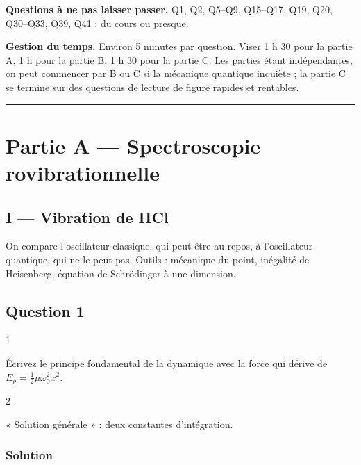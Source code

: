 \documentclass[11pt,a4paper]{article}
\begin{document}
\textbf{Questions à ne pas laisser passer.} Q1, Q2, Q5--Q9, Q15--Q17, Q19, Q20, Q30--Q33, Q39, Q41 : du cours ou presque.

\textbf{Gestion du temps.} Environ 5 minutes par question. Viser 1 h 30 pour la partie A, 1 h pour la partie B, 1 h 30 pour la partie C. Les parties étant indépendantes, on peut commencer par B ou C si la mécanique quantique inquiète ; la partie C se termine sur des questions de lecture de figure rapides et rentables.

\begin{center}\rule{0.5\linewidth}{0.5pt}\end{center}

\hypertarget{partie-a-spectroscopie-rovibrationnelle}{%
\section{Partie A --- Spectroscopie rovibrationnelle}\label{partie-a-spectroscopie-rovibrationnelle}}

\hypertarget{i-vibration-de-hcl}{%
\subsection{I --- Vibration de HCl}\label{i-vibration-de-hcl}}

On compare l'oscillateur classique, qui peut être au repos, à l'oscillateur quantique, qui ne le peut pas. Outils : mécanique du point, inégalité de Heisenberg, équation de Schrödinger à une dimension.

\hypertarget{question-1}{%
\subsection{Question 1}\label{question-1}}

\begin{indication}{1}

Écrivez le principe fondamental de la dynamique avec la force qui dérive de \(E_p=\frac12\mu\omega_0^2x^2\).

\end{indication}

\begin{indication}{2}

« Solution générale » : deux constantes d'intégration.

\end{indication}

\hypertarget{solution}{%
\subsubsection{Solution}\label{solution}}
\end{document}
